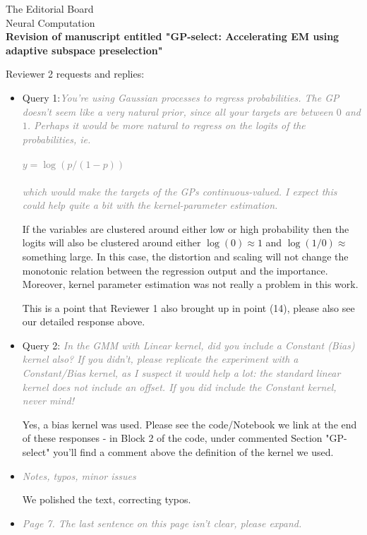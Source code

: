\documentclass[10pt]{letter}
\newcommand{\rvr}[1]{\textcolor{gray}{#1}}
\begin{document}
\begin{letter}{
The Editorial Board\\
Neural Computation\\
\vspace{10mm}
\textbf{Revision of manuscript entitled "GP-select: Accelerating EM using adaptive
subspace preselection"}
}
\begin{enumerate}[topsep=3pt,itemsep=2ex,partopsep=1ex,parsep=1ex]
\end{enumerate}



Reviewer 2 requests and replies:

\begin{itemize}[topsep=3pt,itemsep=2ex,partopsep=1ex,parsep=1ex]

    \item Query 1:\rvr{\emph{You're using Gaussian processes to regress probabilities. The GP doesn't
seem like a very natural prior, since all your targets are between $0$ and
$1$. Perhaps it would be more natural to regress on the logits of the
probabilities, ie.\\
\\
$y = \log(p / (1-p))$\\
\\
which would make the targets of the GPs continuous-valued. I expect this
could help quite a bit with the kernel-parameter estimation.}}


    If the variables are clustered around either low or high probability then the logits will also be clustered around either $\log(0) \approx 1$ and $\log (1/0) \approx$ something large. In this case, the distortion and scaling will not change the monotonic relation between the regression output and the importance. Moreover, kernel parameter estimation was not really a problem in this work.

    This is a point that Reviewer 1 also brought up in point (14), please also see our detailed response above.

    \item  Query 2: \rvr{\emph{In the GMM with Linear kernel, did you include a Constant (Bias) kernel
also? If you didn't, please replicate the experiment with a Constant/Bias
kernel, as I suspect it would help a lot: the standard linear kernel does
not include an offset. If you did include the Constant kernel, never
mind!}}

    Yes, a bias kernel was used. Please see the code/Notebook we link at the end of these responses - in Block 2 of the code, under commented  Section "GP-select" you'll find a comment above the definition of the kernel we used.

    \item \rvr{\emph{Notes, typos, minor issues}}
    
    We polished the text, correcting typos.

    \item \rvr{\emph{Page 7. The last sentence on this page isn't clear, please expand.
}}


\end{itemize}
\end{letter}
\end{document}
